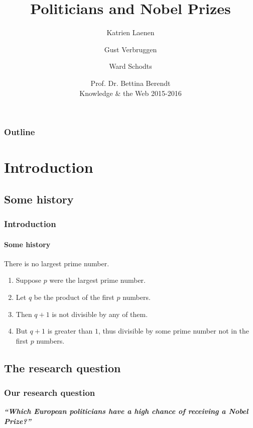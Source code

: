 \documentclass[nonav,sleutel]{beamer}
\title{Politicians and Nobel Prizes}
\date[ISPN '80]{Prof. Dr. Bettina Berendt\\ Knowledge \& the Web 2015-2016}
\author{Katrien Laenen \and Gust Verbruggen \and Ward Schodts}
\begin{document}

\begin{frame}
\titlepage
\end{frame}


\begin{frame}[noframenumbering]
\frametitle{Outline} 
  \tableofcontents[hideallsubsections
  ]

\end{frame}



\section{Introduction}
\subsection{Some history}
\begin{frame}
\frametitle{Introduction} 
\framesubtitle{Some history} 
\begin{theorem}
There is no largest prime number. \end{theorem} 
\begin{enumerate} 
\item<1-| alert@1> Suppose $p$ were the largest prime number. 
\item<2-> Let $q$ be the product of the first $p$ numbers. 
\item<3-> Then $q+1$ is not divisible by any of them. 
\item<1-> But $q + 1$ is greater than $1$, thus divisible by some prime
number not in the first $p$ numbers.
\end{enumerate}
\end{frame}

\subsection{The research question}
\begin{frame}
\frametitle{Our research question} 

\textit{\textbf{\Large ``Which European politicians have a high chance of
receiving a Nobel Prize?''}}


\end{frame}
\end{document}
